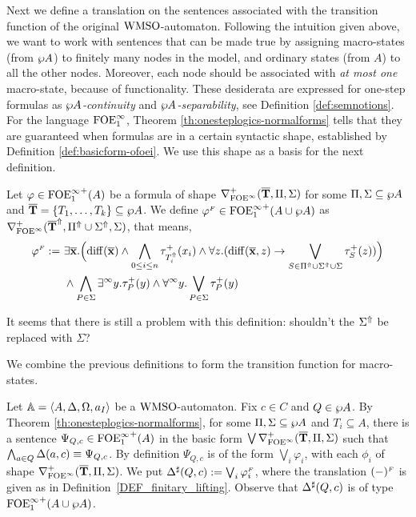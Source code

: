 Next we define a translation on the sentences associated with the transition
function of the original $\mathrm{WMSO}$-automaton.
Following the intuition given above, we want to work with sentences that can be
made true by assigning macro-states (from $\wp A$) to finitely many nodes in the
model, and ordinary states (from $A$) to all the other nodes.
Moreover, each node should be associated with \emph{at most one} macro-state,
because of functionality. 
These desiderata are expressed for one-step formulas as \emph{$\wp A$-continuity} and 
\emph{$\wp A$-separability}, see Definition \ref{def:semnotions}.
For the language $\mathrm{FOE}^{\infty}_1$, Theorem \ref{th:onesteplogics-normalforms} tells that they 
are guaranteed when formulas are in a certain syntactic shape, established by 
Definition \ref{def:basicform-ofoei}. 
We use this shape as a basis for the next definition.

\begin{definition}\label{DEF_finitary_lifting}
Let $\varphi \in {\ensuremath{\mathrm{FOE}^{\infty}_1}}^+(A)$ be a formula of shape 
$\nabla^+_{\mathrm{FOE}^{\infty}}(\overline{{\mathbf{T}}},\Pi,\Sigma)$ for some $\Pi,\Sigma \subseteq \wp A$ 
and $\overline{{\mathbf{T}}} = \{T_1,\dots,T_k\} \subseteq \wp A$. 
We define $\varphi^{{\scriptscriptstyle F}} \in {\ensuremath{\mathrm{FOE}^{\infty}_1}}^+(A \cup \wp A)$ as 
$\nabla^+_{\mathrm{FOE}^{\infty}}(\overline{{\mathbf{T}}}^{\Uparrow},\Pi^{\Uparrow} \cup \Sigma^{\Uparrow},\Sigma)$, that
means,
\begin{equation}\label{eq:unfoldingNablaolque}
\begin{aligned}
\varphi^{\fin} \df\ &
    \exists \vlist{x}.\Big(\arediff{\vlist{x}}
      \land \bigwedge_{0 \leq i \leq n} \tau^+_{\lift{T}_i}(x_i)
\land
    \forall z.(\arediff{\vlist{x},z} \lthen
    \bigvee_{S\in \lift{\Pi} \cup \lift{\Sigma} \cup \Sigma}
       \tau^+_S(z))\Big)
\\ &
    \land \bigwedge_{P\in\Sigma} \qu y.{\tau}^{+}_P(y)
 \land
    \dqu y.\bigvee_{P\in\Sigma} {\tau}^{+}_P(y)
    \end{aligned}
\end{equation}

\btbs
\item
It seems that there is still a problem with this definition: shouldn't the 
$\Sigma^{\Uparrow}$ be replaced with $\Sigma$?
\etbs
\end{definition}


We combine the previous definitions to form the transition function for macro-states.

\begin{definition}\label{PROP_DeltaPowerset}
Let $\mathbb{A} = \langle{A,\Delta,\Omega,a_I}\rangle$ be a $\mathrm{WMSO}$-automaton. Fix $c \in C$ and $Q \in \wp A$. By Theorem \ref{th:onesteplogics-normalforms}, for some $\Pi,\Sigma \subseteq \wp A$ and $T_i \subseteq A$, there is a sentence $\Psi_{Q,c} \in {\ensuremath{\mathrm{FOE}^{\infty}_1}}^+(A)$ in the basic form $\bigvee \nabla^+_{\mathrm{FOE}^{\infty}}(\overline{{\mathbf{T}}},\Pi,\Sigma)$ such that $\bigwedge_{a \in Q} \Delta(a,c) \equiv \Psi_{Q,c}$. By definition $\Psi_{Q,c}$ is of the form $\bigvee_{i}\varphi_i$, with each $\phi_{i}$ of shape $\nabla^+_{\mathrm{FOE}^{\infty}}(\overline{{\mathbf{T}}},\Pi,\Sigma)$. We put $\Delta^{\sharp}(Q,c) := \bigvee_{i}\varphi_i^{{\scriptscriptstyle F}}$, where the translation $(-)^{{\scriptscriptstyle F}}$ is given as in Definition~\ref{DEF_finitary_lifting}. Observe that $\Delta^{\sharp}(Q,c)$ is of type ${\mathrm{FOE}^{\infty}_1}^+(A \cup \wp A)$.
\end{definition}

